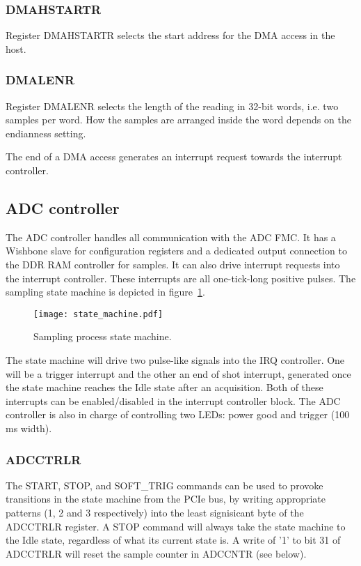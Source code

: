 \documentclass{article}
\begin{document}
\subsubsection{DMAHSTARTR}
Register DMAHSTARTR selects the start address for the DMA access in the host. 

\subsubsection{DMALENR}
Register DMALENR selects the length of the reading in 32-bit words, i.e. two samples per word. How the samples are arranged inside the word depends on the endianness setting. 

The end of a DMA access generates an interrupt request towards the interrupt controller.

\subsection{ADC controller}
The ADC controller handles all communication with the ADC FMC. It has a Wishbone slave for configuration registers and a dedicated output connection to the DDR RAM controller for samples. It can also drive interrupt requests into the interrupt controller. These interrupts are all one-tick-long positive pulses. The sampling state machine is depicted in figure~\ref{fig:state_machine}. 

\begin{figure}[htbp]
  \centering
  \texttt{[image: state\_machine.pdf]}
  \caption{Sampling process state machine.}
  \label{fig:state_machine}
\end{figure}

The state machine will drive two pulse-like signals into the IRQ controller. One will be a trigger interrupt and the other an end of shot interrupt, generated once the state machine reaches the Idle state after an acquisition. Both of these interrupts can be enabled/disabled in the interrupt controller block. The ADC controller is also in charge of controlling two LEDs: power good and trigger (100 ms width).

\subsubsection{ADCCTRLR}
The START, STOP, and SOFT\_TRIG commands can be used to provoke transitions in the state machine from the PCIe bus, by writing appropriate patterns (1, 2 and 3 respectively) into the least signisicant byte of the ADCCTRLR register. A STOP command will always take the state machine to the Idle state, regardless of what its current state is. A write of '1' to bit 31 of ADCCTRLR will reset the sample counter in ADCCNTR (see below).
\end{document}
